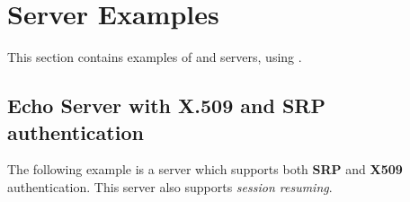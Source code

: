 \documentclass{book}
\begin{document}


\section{Server Examples}
This section contains examples of \tls{} and \ssl{} servers, using \gnutls{}.

\subsection{Echo Server with X.509 and SRP authentication}
The following example is a server which supports both {\bf SRP} and {\bf X509} authentication.
This server also supports {\it session resuming}.







\end{document}
